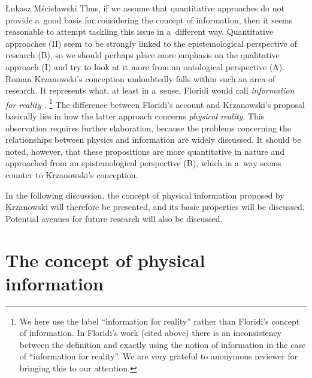 \begin{artengenv}{Łukasz Mścisławski}
Thus, if we assume that quantitative approaches do not provide a~good basis for considering the concept of information, then it seems reasonable to attempt tackling this issue in a~different way. Quantitative approaches (II) seem to be strongly linked to the epistemological perspective of research (B), so we should perhaps place more emphasis on the qualitative approach (I) and try to look at it more from an ontological perspective (A). Roman Krzanowski's conception undoubtedly falls within such an area of research. It represents what, at least in a~sense, Floridi would call \textit{information for reality}
\parencite[][pp.30–31]{floridi_philosophy_2011}.%
\footnote{We here use the label ``information for reality'' rather than Floridi's concept of information. In Floridi's work (cited above) there is an inconsistency between the definition and exactly using the notion of information in the case of ``information for reality''. We are very grateful to anonymous reviewer for bringing this to our attention.} The difference between Floridi's account and Krzanowski's proposal basically lies in how the latter approach concerns \textit{physical reality}. This observation requires further elaboration, because the problems concerning the relationships between physics and information are widely discussed. It should be noted, however, that these propositions are more quantitative in nature and approached from an epistemological perspective (B), which in a~way seems counter to Krzanowski's conception.

In the following discussion, the concept of physical information proposed by Krzanowski will therefore be presented, and its basic properties will be discussed. Potential avenues for future research will also be discussed.

\section{The concept of physical information}


\begin{flushright}
\end{flushright}


\end{artengenv}
